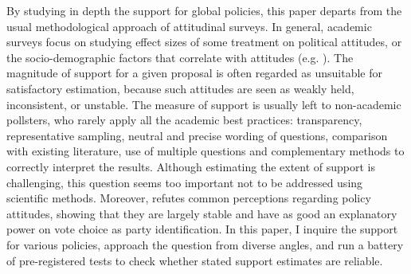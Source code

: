 \documentclass[12pt,english]{article}
\begin{document}
\begin{bibunit}
By studying in depth the support for global policies, this paper departs from the usual  %
methodological approach of attitudinal surveys. In general, academic surveys focus on studying effect sizes of some treatment on political attitudes, or the socio-demographic factors that correlate with attitudes (e.g. \citealp{kuziemko_how_2015,douenne_yellow_2022,alesina_intergenerational_2018}). The magnitude of support for a given proposal is often regarded as unsuitable for satisfactory estimation, %
because such attitudes are seen as weakly held, inconsistent, or unstable. 
The measure of support is usually left to non-academic pollsters, who rarely apply all the academic best practices: transparency, representative sampling, neutral and precise wording of questions, comparison with existing literature, use of multiple questions and complementary methods to correctly interpret the results. Although estimating the extent of support is challenging, this question seems too important not to be addressed using scientific methods. 
Moreover, \cite{ansolabehere_strength_2008} refutes common perceptions regarding policy attitudes, showing that they are largely stable and %
have as good an explanatory power on vote choice as party identification.  
In this paper, I inquire the support for various policies, approach the question from diverse angles, and run a battery of pre-registered tests to check whether stated support estimates are reliable.





\end{bibunit}
\end{document}
